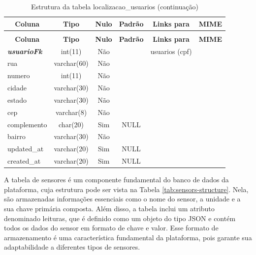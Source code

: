 \documentclass[tcc,capa]{texufpel}
\begin{document}
%
%
\begin{longtable}{|l|c|c|c|l|l|}
\caption{Estrutura da tabela localizacao\_usuarios} \label{tab:localizacao_usuarios-structure} \\
\hline \multicolumn{1}{|c|}{\textbf{Coluna}} & \multicolumn{1}{|c|}{\textbf{Tipo}} & \multicolumn{1}{|c|}{\textbf{Nulo}} & \multicolumn{1}{|c|}{\textbf{Padrão}} & \multicolumn{1}{|c|}{\textbf{Links para}} & \multicolumn{1}{|c|}{\textbf{MIME}} \\ \hline \hline
\endfirsthead
\caption{Estrutura da tabela localizacao\_usuarios (continuação)} \\
\hline \multicolumn{1}{|c|}{\textbf{Coluna}} & \multicolumn{1}{|c|}{\textbf{Tipo}} & \multicolumn{1}{|c|}{\textbf{Nulo}} & \multicolumn{1}{|c|}{\textbf{Padrão}} & \multicolumn{1}{|c|}{\textbf{Links para}} & \multicolumn{1}{|c|}{\textbf{MIME}} \\ \hline \hline \endhead \endfoot
\textbf{\textit{usuarioFk}} & int(11) & Não &  & usuarios (cpf) &  \\ \hline
rua & varchar(60) & Não &  &  &  \\ \hline
numero & int(11) & Não &  &  &  \\ \hline
cidade & varchar(30) & Não &  &  &  \\ \hline
estado & varchar(30) & Não &  &  &  \\ \hline
cep & varchar(8) & Não &  &  &  \\ \hline
complemento & char(20) & Sim & NULL &  &  \\ \hline
bairro & varchar(30) & Não &  &  &  \\ \hline
updated\_at & varchar(20) & Sim & NULL &  &  \\ \hline
created\_at & varchar(20) & Sim & NULL &  &  \\ \hline
\end{longtable}


A tabela de sensores é um componente fundamental do banco de dados da plataforma, cuja estrutura pode ser vista na Tabela \ref{tab:sensors-structure}. Nela, são armazenadas informações essenciais como o nome do sensor, a unidade e a sua chave primária composta. Além disso, a tabela inclui um atributo denominado leituras, que é definido como um objeto do tipo JSON e contém todos os dados do sensor em formato de chave e valor. Esse formato de armazenamento é uma característica fundamental da plataforma, pois garante sua adaptabilidade a diferentes tipos de sensores.
\end{document}
